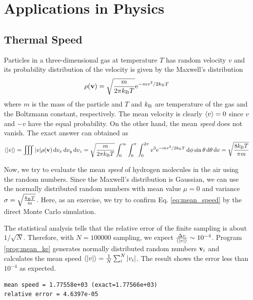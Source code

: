 \noindent
\section{Applications in Physics}

\subsection{Thermal Speed}

Particles in a three-dimensional gas at temperature $T$ has random velocity $v$ and its probability distribution of the velocity is given by the Maxwell's distribution
\begin{equation}
\rho(\vb{v}) = \sqrt{\frac{m}{2 \pi k_\text{B} T}} \text{e}^{-m v^2/2 k_\text{B} T}
\end{equation}
where $m$ is the mass of the particle and $T$ and $k_\text{B}$ are temperature of the gas and the Boltzmann constant, respectively.
The mean velocity is clearly $\langle v \rangle=0$ since $v$ and $-v$ have the equal probability.  On the other hand, the mean \emph{speed} does not vanish. The exact answer can obtained as
\begin{equation}\label{eq:mean_speed}
\langle |v| \rangle = \iiint |v| \rho(\vb{v}) \dd{v_x} \dd{v_y} \dd{v_z} =\sqrt{\frac{m}{2 \pi k_\text{B} T}}\int_0^\infty \int_0^\pi \int_0^{2\pi} v^3 \text{e}^{-m v^2/2 k_\text{B} T} \dd{\phi} \sin\theta \dd{\theta} \dd{v} = \sqrt{\frac{8 k_\text{B} T}{\pi m}}
\end{equation}

Now, we try to evaluate the mean \emph{speed} of hydrogen molecules in the air  using the random numbers.  Since the Maxwell's distribution is Gaussian, we can use the normally distributed random numbers with mean value $\mu=0$ and variance $\sigma=\sqrt{\frac{k_\text{B} T}{m}}$. Here, as an exercise, we try to confirm Eq. \eqref{eq:mean_speed}  by the direct Monte Carlo simulation. 

The statistical analysis tells that the relative error of the finite sampling is about $1/\sqrt{N}$.
Therefore, with $N=100000$ sampling, we expect $\frac{\Delta v}{\langle |v| \rangle} \sim 10^{-4}$.  Program \ref{prog:mean_ke} generates
normally distributed random numbers $\vb{v}_i$ and calculates the mean speed $\langle |v| \rangle = \frac{1}{N} \sum_i^{N} |v_i|$.  The result shows the error less than $10^{-4}$ as expected.

\begin{center}
\begin{minipage}{4in}
\small
\begin{Verbatim}[frame=single]
mean speed = 1.77558e+03 (exact=1.77566e+03)
relative error = 4.6397e-05
\end{Verbatim}
\normalsize
\end{minipage}
\end{center}

